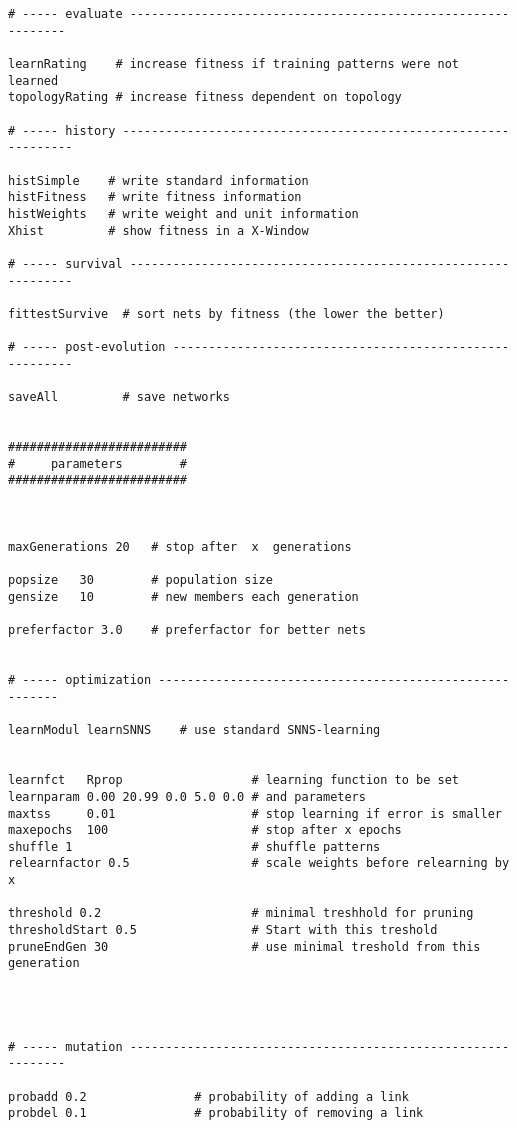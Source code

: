 {\begin{verbatim}
# ----- evaluate -------------------------------------------------------------

learnRating    # increase fitness if training patterns were not learned
topologyRating # increase fitness dependent on topology

# ----- history ---------------------------------------------------------------

histSimple    # write standard information
histFitness   # write fitness information
histWeights   # write weight and unit information
Xhist         # show fitness in a X-Window 

# ----- survival --------------------------------------------------------------

fittestSurvive  # sort nets by fitness (the lower the better)

# ----- post-evolution --------------------------------------------------------

saveAll         # save networks


#########################
#     parameters        #
#########################



maxGenerations 20   # stop after  x  generations

popsize   30        # population size
gensize   10        # new members each generation

preferfactor 3.0    # preferfactor for better nets


# ----- optimization --------------------------------------------------------

learnModul learnSNNS    # use standard SNNS-learning


learnfct   Rprop                  # learning function to be set
learnparam 0.00 20.99 0.0 5.0 0.0 # and parameters
maxtss     0.01                   # stop learning if error is smaller 
maxepochs  100                    # stop after x epochs
shuffle 1                         # shuffle patterns
relearnfactor 0.5                 # scale weights before relearning by x

threshold 0.2                     # minimal treshhold for pruning
thresholdStart 0.5                # Start with this treshold
pruneEndGen 30                    # use minimal treshold from this generation  




# ----- mutation -------------------------------------------------------------

probadd 0.2               # probability of adding a link
probdel 0.1               # probability of removing a link


\end{verbatim}}

